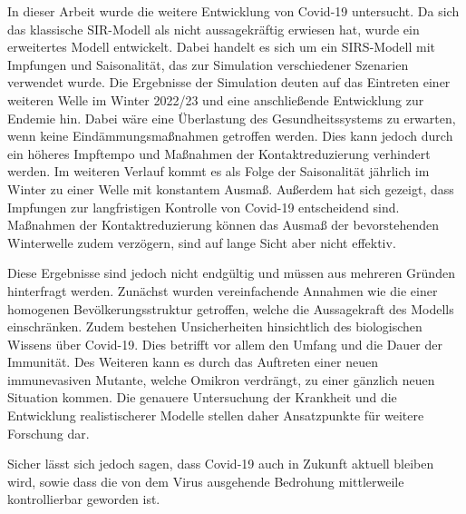 \documentclass[../main.tex]{subfiles}
\begin{document}
    In dieser Arbeit wurde die weitere Entwicklung von Covid-19 untersucht. Da sich das klassische SIR-Modell als nicht aussagekräftig erwiesen hat, wurde ein erweitertes Modell entwickelt. Dabei handelt es sich um ein SIRS-Modell mit Impfungen und Saisonalität, das zur Simulation verschiedener Szenarien verwendet wurde.
    Die Ergebnisse der Simulation deuten auf das Eintreten einer weiteren Welle im Winter 2022/23 und eine anschließende Entwicklung zur Endemie hin. Dabei wäre eine Überlastung des Gesundheitssystems zu erwarten, wenn keine Eindämmungsmaßnahmen getroffen werden. Dies kann jedoch durch ein höheres Impftempo und Maßnahmen der Kontaktreduzierung verhindert werden. Im weiteren Verlauf kommt es als Folge der Saisonalität jährlich im Winter zu einer Welle mit konstantem Ausmaß.
    Außerdem hat sich gezeigt, dass Impfungen zur langfristigen Kontrolle von Covid-19 entscheidend sind. Maßnahmen der Kontaktreduzierung können das Ausmaß der bevorstehenden Winterwelle zudem verzögern, sind auf lange Sicht aber nicht effektiv.

    Diese Ergebnisse sind jedoch nicht endgültig und müssen aus mehreren Gründen hinterfragt werden. Zunächst wurden vereinfachende Annahmen wie die einer homogenen Bevölkerungsstruktur getroffen, welche die Aussagekraft des Modells einschränken.
    Zudem bestehen Unsicherheiten hinsichtlich des biologischen Wissens über Covid-19. Dies betrifft vor allem den Umfang und die Dauer der Immunität. Des Weiteren kann es durch das Auftreten einer neuen immunevasiven Mutante, welche Omikron verdrängt, zu einer gänzlich neuen Situation kommen.
    Die genauere Untersuchung der Krankheit und die Entwicklung realistischerer Modelle stellen daher Ansatzpunkte für weitere Forschung dar.

    Sicher lässt sich jedoch sagen, dass Covid-19 auch in Zukunft aktuell bleiben wird, sowie dass die von dem Virus ausgehende Bedrohung mittlerweile kontrollierbar geworden ist.
\end{document}
